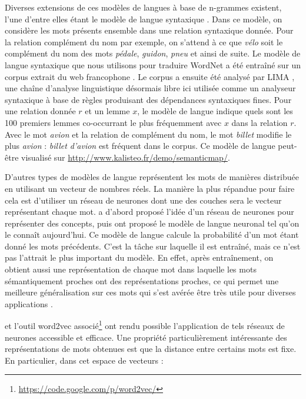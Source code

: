 Diverses extensions de ces modèles de langues à base de n-grammes existent,
l'une d'entre elles étant le modèle de langue syntaxique
\citep{lin1998automatic,goldberg2013dataset}. Dans ce modèle, on considère les
mots présents ensemble dans une relation syntaxique donnée. Pour la relation
complément du nom par exemple, on s'attend à ce que \emph{vélo} soit le
complément du nom des mots \emph{pédale}, \emph{guidon}, \emph{pneu} et ainsi
de suite. Le modèle de langue syntaxique que nous utilisons pour traduire
WordNet a été entraîné sur un corpus extrait du web francophone
\citep{grefenstette2007conquering}. Le corpus a ensuite été analysé par LIMA
\citep{besancon2010lima}, une chaîne d'analyse linguistique désormais libre ici
utilisée comme un analyseur syntaxique à base de règles produisant des
dépendances syntaxiques fines. Pour une relation donnée $r$ et un lemme $x$, le
modèle de langue indique quels sont les 100 premiers lemmes co-occurrant le
plus fréquemment avec $x$ dans la relation $r$.  Avec le mot \textit{avion} et
la relation de complément du nom, le mot \textit{billet} modifie le plus
\textit{avion} : \textit{billet d'avion} est fréquent dans le corpus. Ce modèle
de langue peut-être visualisé sur
\url{http://www.kalisteo.fr/demo/semanticmap/}.


D'autres types de modèles de langue représentent les mots de manières
distribuée en utilisant un vecteur de nombres réels. La manière la plus
répandue pour faire cela est d'utiliser un réseau de neurones dont une des
couches sera le vecteur représentant chaque mot. \cite{hinton1986learning} a
d'abord proposé l'idée d'un réseau de neurones pour représenter des concepts,
puis \cite{bengio2001neural,bengio2003neural} ont proposé le modèle de langue
neuronal tel qu'on le connaît aujourd'hui. Ce modèle de langue calcule la
probabilité d'un mot étant donné les mots précédents. C'est la tâche sur
laquelle il est entraîné, mais ce n'est pas l'attrait le plus important du
modèle. En effet, après entraînement, on obtient aussi une représentation de
chaque mot dans laquelle les mots sémantiquement proches ont des
représentations proches, ce qui permet une meilleure généralisation sur ces
mots qui s'est avérée être très utile pour diverses applications \citep{senna}.


\cite{mikolov2013efficient} et l'outil word2vec
associé\footnote{\url{https://code.google.com/p/word2vec/}} ont rendu possible
l'application de tels réseaux de neurones accessible et efficace. Une propriété
particulièrement intéressante des représentations de mots obtenues est que la
distance entre certains mots est fixe. En particulier, dans cet espace de
vecteurs :

